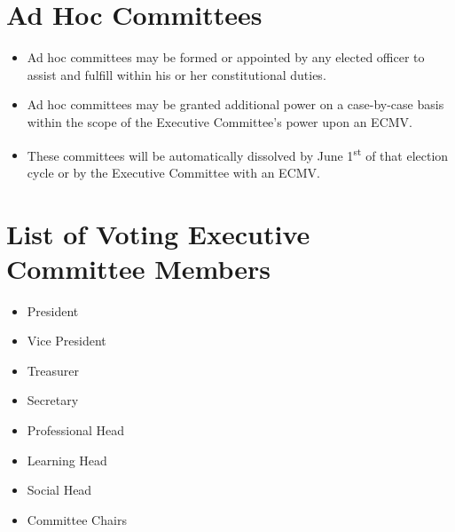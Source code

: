 \documentclass[12pt]{constitution}
\newcommand{\datetermstart}{June 1\textsuperscript{st}} %
\begin{document}
\section{Ad Hoc Committees}
\label{sec:exec_adhoc}
\begin{itemize}
    \item Ad hoc committees may be formed or appointed by any elected officer to assist and fulfill within his or her constitutional duties.
    \item Ad hoc committees may be granted additional power on a case-by-case basis within the scope of the Executive Committee’s power upon an ECMV.
    \item These committees will be automatically dissolved by \datetermstart{} of that election cycle or by the Executive Committee with an ECMV.
\end{itemize}


\label{art:officers}

\section{List of Voting Executive Committee Members}
\label{sec:officer_list}
\begin{itemize}
    \item President
    \item Vice President
    \item Treasurer
    \item Secretary
    \item Professional Head
    \item Learning Head
    \item Social Head
    \item Committee Chairs
\end{itemize}
\end{document}
